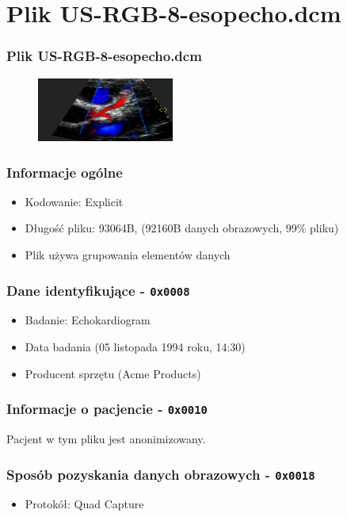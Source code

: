 
\section{Plik US-RGB-8-esopecho.dcm}
\begin{frame}
  \frametitle{Plik US-RGB-8-esopecho.dcm}

  \begin{figure}
    \includegraphics[width=0.4\textwidth]{esopecho}
  \end{figure}
\end{frame}

\begin{frame}
  \frametitle{Informacje ogólne}
  \begin{itemize}
    \item Kodowanie: Explicit
    \item Długość pliku: 93064B, (92160B danych obrazowych, 99\% pliku)
    \item Plik używa grupowania elementów danych
  \end{itemize}
\end{frame}

\begin{frame}
  \frametitle{Dane identyfikujące - \texttt{0x0008}}

  \begin{itemize}
    \item Badanie: Echokardiogram
    \item Data badania (05 listopada 1994 roku, 14:30)
    \item Producent sprzętu (Acme Products)
  \end{itemize}
\end{frame}


\begin{frame}
  \frametitle{Informacje o pacjencie - \texttt{0x0010}}
  Pacjent w tym pliku jest anonimizowany.
\end{frame}

\begin{frame}
  \frametitle{Sposób pozyskania danych obrazowych - \texttt{0x0018}}

  \begin{itemize}
    \item Protokół: Quad Capture
  \end{itemize}
\end{frame}

